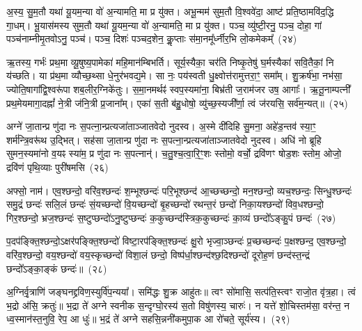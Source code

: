 अ॒स्य॒ सु॒म॒तौ यथा॑ यू॒यम॒न्या वो॑ अ॒न्यामति॒ मा प्र यु॑क्त। अभू॒न्मम॑ सुम॒तौ वि॒श्ववे॑दा॒ आष्ट॑ प्रति॒ष्ठामवि॑द॒द्धि गा॒धम्। भू॒यास॑मस्य सुम॒तौ यथा॑ यू॒यम॒न्या वो॑ अ॒न्यामति॒ मा प्र यु॑क्त। पञ्च॒ व्यु॑ष्टी॒रनु॒ पञ्च॒ दोहा॒ गां पञ्च॑नाम्नीमृ॒तवो\-ऽनु॒ पञ्च॑। पञ्च॒ दिशः॑ पञ्चद॒शेन॒ कॢ॒प्ताः स॑मा॒नमू᳚र्ध्नीर॒भि लो॒कमेकम्᳚~(२४)

ऋ॒तस्य॒ गर्भः॑ प्रथ॒मा व्यू॒षुष्य॒पामेका॑ महि॒मान॑म्बिभर्ति। सूर्य॒स्यैका॒ चर॑ति निष्कृ॒तेषु॑ घ॒र्मस्यैका॑ सवि॒तैकां॒ नि य॑च्छति। या प्र॑थ॒मा व्यौच्छ॒थ्सा धे॒नुर॑भवद्य॒मे। सा नः॒ पय॑स्वती धु॒क्ष्वोत्त॑रामुत्तरा॒ꣳ॒ समा᳚म्। शु॒क्रर्\mbox{}ष॑भा॒ नभ॑सा॒ ज्योति॒षागा᳚द्वि॒श्वरू॑पा शब॒लीर॒ग्निके॑तुः। स॒मा॒नमर्थꣴ॑ स्वप॒स्यमा॑ना॒ बिभ्र॑ती ज॒राम॑जर उष॒ आगाः᳚। ऋ॒तू॒नाम्पत्नी᳚ प्रथ॒मेयमागा॒दह्नां᳚ ने॒त्री ज॑नि॒त्री प्र॒जाना᳚म्। एका॑ स॒ती ब॑हु॒धोषो॒ व्यु॑च्छ॒स्यजी᳚र्णा॒ त्वं ज॑रयसि॒ सर्व॑म॒न्यत्॥~(२५)

{\anuvakamend[{ऊर्ज॒मेका᳚ प्रतिमु॒ञ्चमा॑ना भू॒यास॒मेकं॒ पत्न्येका॒न्नविꣳ॑श॒तिश्च॑}]}%

अग्ने॑ जा॒तान्प्र णु॑दा नः स॒पत्ना॒न्प्रत्यजा॑ताञ्जातवेदो नुदस्व। अ॒स्मे दी॑दिहि सु॒मना॒ अहे॑ड॒न्तव॑ स्या॒ꣳ॒ शर्म॑न्त्रि॒वरू॑थ उ॒द्भित्। सह॑सा जा॒तान्प्र णु॑दा नः स॒पत्ना॒न्प्रत्यजा॑ताञ्जातवेदो नुदस्व। अधि॑ नो ब्रूहि सुमन॒स्यमा॑नो व॒यꣴ स्या॑म॒ प्र णु॑दा नः स॒पत्नान्॑। च॒तु॒श्च॒त्वा॒रि॒ꣳ॒शः स्तोमो॒ वर्चो॒ द्रवि॑णꣳ षोड॒शः स्तोम॒ ओजो॒ द्रवि॑णं पृथि॒व्याः पुरी॑षमसि~(२६)

अफ्सो॒ नाम॑। एव॒श्छन्दो॒ वरि॑व॒श्छन्दः॑ श॒म्भूश्छन्दः॑ परि॒भूश्छन्द॑ आ॒च्छच्छन्दो॒ मन॒श्छन्दो॒ व्यच॒श्छन्दः॒ सिन्धु॒श्छन्दः॑ समु॒द्रं छन्दः॑ सलि॒लं छन्दः॑ सं॒यच्छन्दो॑ वि॒यच्छन्दो॑ बृ॒हच्छन्दो॑ रथन्त॒रं छन्दो॑ निका॒यश्छन्दो॑ विव॒धश्छन्दो॒ गिर॒श्छन्दो॒ भ्रज॒श्छन्दः॑ स॒ष्टुप्छन्दो॑\-ऽनु॒ष्टुप्छन्दः॑ क॒कुच्छन्द॑स्त्रिक॒कुच्छन्दः॑ का॒व्यं छन्दो᳚\-ऽङ्कु॒पं छन्दः॑~(२७)

प॒दप॑ङ्क्ति॒श्छन्दो॒\-ऽक्षर॑पङ्क्ति॒श्छन्दो॑ विष्टा॒रप॑ङ्क्ति॒श्छन्दः॑ क्षु॒रो भृज्वा॒ञ्छन्दः॑ प्र॒च्छच्छन्दः॑ प॒क्षश्छन्द॒ एव॒श्छन्दो॒ वरि॑व॒श्छन्दो॒ वय॒श्छन्दो॑ वय॒स्कृच्छन्दो॑ विशा॒लं छन्दो॒ विष्प॑र्धा॒श्छन्द॑श्छ॒दिश्छन्दो॑ दूरोह॒णं छन्द॑स्त॒न्द्रं छन्दो᳚\-ऽङ्का॒ङ्कं छन्दः॑॥~(२८)

{\anuvakamend[{अ॒स्य॒ङ्कु॒पञ्छन्द॒स्त्रय॑स्त्रिꣳशच्च}]}%

अ॒ग्निर्वृ॒त्राणि॑ जङ्घनद्द्रविण॒स्युर्वि॑प॒न्यया᳚। समि॑द्धः शु॒क्र आहु॑तः॥ त्वꣳ सो॑मासि॒ सत्प॑ति॒स्त्वꣳ राजो॒त वृ॑त्र॒हा। त्वं भ॒द्रो अ॑सि॒ क्रतुः॑॥ भ॒द्रा ते॑ अग्ने स्वनीक स॒न्दृग्घो॒रस्य॑ स॒तो विषु॑णस्य॒ चारुः॑। न यत्ते॑ शो॒चिस्तम॑सा॒ वर॑न्त॒ न ध्व॒स्मान॑स्त॒नुवि॒ रेप॒ आ धुः॑॥ भ॒द्रं ते॑ अग्ने सहसि॒न्ननी॑कमुपा॒क आ रो॑चते॒ सूर्य॑स्य।~(२९)

